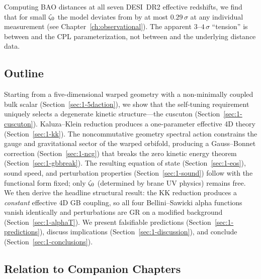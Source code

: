 Computing BAO distances at all seven DESI~DR2 effective redshifts, we find that for small $\zeta_0$ the model deviates from \LCDM{} by at most $0.29\,\sigma$ at any individual measurement (see Chapter~\ref{ch:observational}). The apparent $3$--$4\,\sigma$ ``tension'' is between \LCDM{} and the CPL parameterization, not between \LCDM{} and the underlying distance data.

\subsection{Outline}
\label{sec:1-outline}

Starting from a five-dimensional warped geometry with a non-minimally coupled bulk scalar (Section~\ref{sec:1-5daction}), we show that the self-tuning requirement uniquely selects a degenerate kinetic structure---the cuscuton (Section~\ref{sec:1-cuscuton}). Kaluza--Klein reduction produces a one-parameter effective 4D theory (Section~\ref{sec:1-kk}). The noncommutative geometry spectral action constrains the gauge and gravitational sector of the warped orbifold, producing a Gauss--Bonnet correction (Section~\ref{sec:1-ncg}) that breaks the zero kinetic energy theorem (Section~\ref{sec:1-gbbreak}). The resulting equation of state (Section~\ref{sec:1-eos}), sound speed, and perturbation properties (Section~\ref{sec:1-sound}) follow with the functional form fixed; only $\zeta_0$ (determined by brane UV physics) remains free. We then derive the headline structural result: the KK reduction produces a \emph{constant} effective 4D GB coupling, so all four Bellini--Sawicki alpha functions vanish identically and perturbations are GR on a modified background (Section~\ref{sec:1-alphaT}). We present falsifiable predictions (Section~\ref{sec:1-predictions}), discuss implications (Section~\ref{sec:1-discussion}), and conclude (Section~\ref{sec:1-conclusions}).

\subsection{Relation to Companion Chapters}
\label{sec:1-companion}

